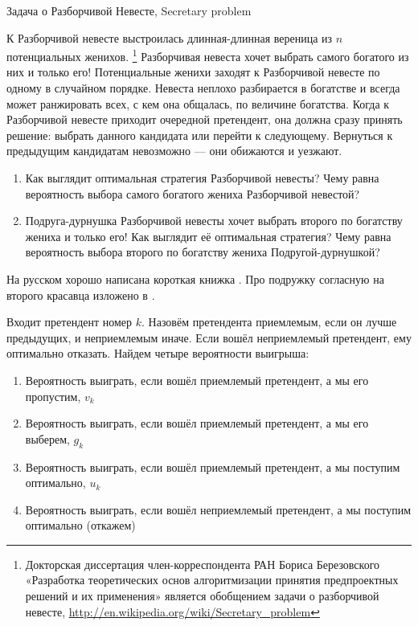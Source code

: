 \documentclass[12pt]{article}
\newcounter{problem}[section]
\newenvironment{problem}%
{%
\refstepcounter{problem}%
     \hypertarget{problem:{\thesection.\theproblem}}{} %
     \Writetofile{solution_file}{\protect\hypertarget{soln:\thesection.\theproblem}{}}
     \begin{myenum}[label=\bfseries\protect\hyperlink{soln:\thesection.\theproblem}{\thesection.\theproblem},ref=\thesection.\theproblem]
     \item%
    }%
    {%
    \end{myenum}}
\theoremstyle{definition}
\begin{document}
\begin{problem}
Задача о Разборчивой Невесте, Secretary problem

К Разборчивой невесте выстроилась длинная-длинная вереница из $n$ потенциальных женихов.
\footnote{Докторская диссертация член-корреспондента РАН Бориса Березовского
«Разработка теоретических основ алгоритмизации принятия предпроектных решений и их применения»
является обобщением задачи о разборчивой невесте, \url{http://en.wikipedia.org/wiki/Secretary_problem}}
Разборчивая невеста хочет выбрать самого богатого из них и только его!
Потенциальные женихи заходят к Разборчивой невесте по одному в случайном порядке.
Невеста неплохо разбирается в богатстве и всегда может ранжировать всех, с кем она общалась,
по величине богатства. Когда к Разборчивой невесте приходит очередной претендент,
она должна сразу принять решение: выбрать данного кандидата или перейти к следующему.
Вернуться к предыдущим кандидатам невозможно — они обижаются и уезжают.

\begin{enumerate}
\item Как выглядит оптимальная стратегия Разборчивой невесты? Чему равна вероятность выбора самого богатого жениха Разборчивой невестой?
\item Подруга-дурнушка Разборчивой невесты хочет выбрать второго по богатству жениха и только его!
Как выглядит её оптимальная стратегия?
Чему равна вероятность выбора второго по богатству жениха Подругой-дурнушкой?
\end{enumerate}

\begin{sol}

На русском хорошо написана короткая книжка \cite{zade2003nevesta}.
Про подружку согласную на второго красавца изложено в \cite{vanderbei2011postdoc}.

Входит претендент номер $k$. Назовём претендента приемлемым, если он лучше предыдущих,
и неприемлемым иначе. Если вошёл неприемлемый претендент, ему оптимально отказать.
Найдем четыре вероятности выигрыша:

\begin{enumerate}
  \item Вероятность выиграть, если вошёл приемлемый претендент, а мы его пропустим, $v_k$
  \item Вероятность выиграть, если вошёл приемлемый претендент, а мы его выберем, $g_k$
  \item Вероятность выиграть, если вошёл приемлемый претендент, а мы поступим оптимально, $u_k$
  \item Вероятность выиграть, если вошёл неприемлемый претендент, а мы поступим оптимально (откажем)
\end{enumerate}


\end{sol}
\end{problem}
\end{document}
